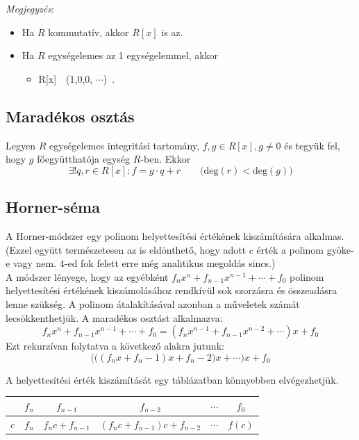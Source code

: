\documentclass[12pt,margin=0px]{article}
\begin{document}
    \noindent \textit{Megjegyzés}:
    \begin{itemize}[leftmargin=5.5mm]
        \renewcommand{\labelitemi}{$\vcenter{\hbox{\tiny$\bullet$}}$}
        \item Ha $R$ kommutatív, akkor $R[x]$ is az.
        \item Ha $R$ egységelemes az 1 egységelemmel, akkor
        \begin{itemize}
            \item R[x]\ \ (1,0,0, $\cdots$)\ .
        \end{itemize}
    \end{itemize}
		
\subsection*{Maradékos osztás}

	Legyen $R$ egységelemes integritási tartomány, $f,g\in R[x], g \neq 0$ és tegyük fel, hogy $g$ főegyütthatója egység $R$-ben. Ekkor
	\[
        \exists! q,r \in R[x] : f = g\cdot q+r \qquad \big(\text{deg}(r) < \text{deg}(g)\big)
    \]
			
	\subsection*{Horner-séma}
    A Horner-módszer egy polinom helyettesítési értékének kiszámítására alkalmas. (Ezzel együtt természetesen az is eldönthető, hogy adott $c$ érték a polinom gyöke-e vagy nem. 4-ed fok felett erre még analitikus megoldás sincs.)\\
			
    \noindent A módszer lényege, hogy az egyébként $f_nx^n+f_{n-1}x^{n-1}+\cdots+f_0$ polinom helyettesítési értékének kiszámolásához rendkívül sok szorzásra és összeadásra lenne szükség. A polinom átalakításával azonban a műveletek számát lecsökkenthetjük. A maradékos osztást alkalmazva:
    \[
        f_nx^n+f_{n-1}x^{n-1}+\cdots+f_0 = \left(f_nx^{n-1}+f_{n-1}x^{n-2}+\cdots\right)x+f_0
    \]
	Ezt rekurzívan folytatva a következő alakra jutunk:
	\[
        \Big(\big((f_nx+f_n-1)x+f_n-2\big) x+ \cdots\Big) x+f_0
    \]
	
    \noindent A helyettesítési érték kiszámítását egy táblázatban könnyebben elvégezhetjük.
			
	\begin{center}
        \begin{tabular}{|c|c|c|c|c|c|}
            \hline  & $f_n$ & $f_{n-1}$ & $f_{n-2}$ & $\cdots$ & $f_0$ \\
            \hline $c$ & $f_n$ & $f_nc+f_{n-1}$ & $(f_nc+f_{n-1})c+f_{n-2}$ & $\cdots$ & $f(c)$ \\
            \hline
        \end{tabular}
	\end{center}		
\end{document}
